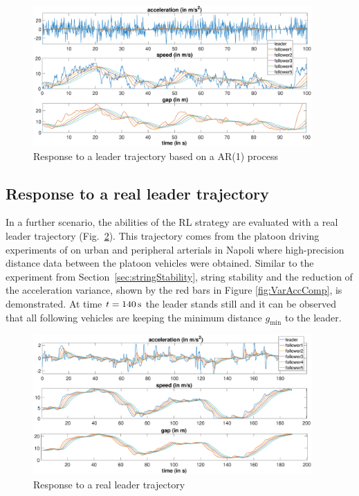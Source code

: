 \documentclass[review]{elsarticle}
\providecommand{\martin}[1]{#1}                  %
\providecommand{\sub}[1]{_{\mathrm{#1}}}  %
\providecommand{\3}{{\ss}}
\begin{document}
\begin{figure}
	\centering
	\includegraphics[width=0.95\textwidth]{images/AR1Kolonne}
	\caption{Response to a leader trajectory based on a AR(1) process}
	\label{fig:AR1Kolonne}
\end{figure}


\subsection{Response to a real leader trajectory}

In a further scenario, the abilities of the RL strategy are evaluated
with a real leader trajectory (Fig.~\ref{fig:PunzoKolonne}). This
trajectory comes from \martin{the platoon driving experiments of
  \cite{punzo2005nonstationary} on urban and peripheral arterials in Napoli}
where high-precision distance data between the platoon
vehicles were obtained. Similar to the experiment from
Section~\ref{sec:stringStability}, string stability and the reduction
of  the acceleration variance, shown by the red bars in Figure
\ref{fig:VarAccComp}, is demonstrated. At time $t = \unit[140]{s}$ the leader
stands still and it can be observed that all following vehicles are
keeping the minimum distance $g\sub{min}$ to the leader.  


\begin{figure}
	\centering
	\includegraphics[width=0.95\textwidth]{images/PunzoKolonne}
	\caption{Response to a real leader trajectory}
	\label{fig:PunzoKolonne}
\end{figure}
\end{document}
